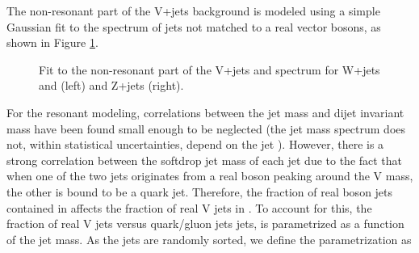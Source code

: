 The non-resonant part of the V+jets background is modeled using a simple Gaussian fit to the spectrum of jets not matched to a real vector bosons, as shown in Figure \ref{fig:Vjets_fits_nonRes}.
\begin{figure}[h!]
\centering
{}
\caption{Fit to the non-resonant part of the V+jets and \ttbar spectrum for W+jets and \ttbar (left) and Z+jets (right).}
\label{fig:Vjets_fits_nonRes}
\end{figure}
For the resonant modeling, correlations between the jet mass \MJ and dijet invariant mass \MVV have been found small enough to be neglected (the jet mass spectrum does not, within statistical uncertainties, depend on the jet \PT). However, there is a strong correlation between the softdrop jet mass of each jet due to the fact that when one of the two jets originates from a real boson peaking around the V mass, the other is bound to be a quark jet. Therefore, the fraction of real boson jets contained in \MJO affects the fraction of real V jets in \MJT. To account for this, the fraction of real V jets versus quark/gluon jets jets, is parametrized as a function of the jet mass. As the jets are randomly sorted, we define the parametrization as
